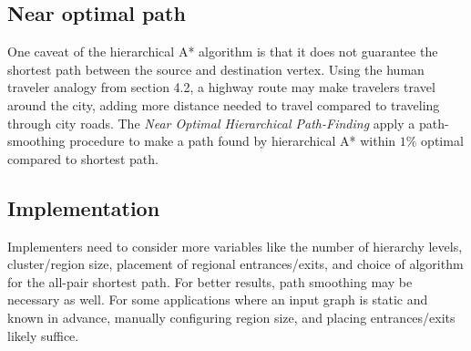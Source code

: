 \documentclass{article}
\begin{document}
\subsection{Near optimal path}
One caveat of the hierarchical A* algorithm is that it does not guarantee the shortest path between the source and destination vertex. Using the human traveler analogy from section 4.2, a highway route may make travelers travel around the city, adding more distance needed to travel compared to traveling through city roads\cite{Botea2004NearOH}. The \textit{Near Optimal Hierarchical Path-Finding} apply a path-smoothing procedure to make a path found by hierarchical A* within $1\%$ optimal compared to shortest path\cite{Botea2004NearOH}.

\subsection{Implementation}
Implementers need to consider more variables like the number of hierarchy levels, cluster/region size, placement of regional entrances/exits, and choice of algorithm for the all-pair shortest path. For better results, path smoothing may be necessary as well.
For some applications where an input graph is static and known in advance, manually configuring region size, and placing entrances/exits likely suffice. 

\medskip
 


 
\end{document}
